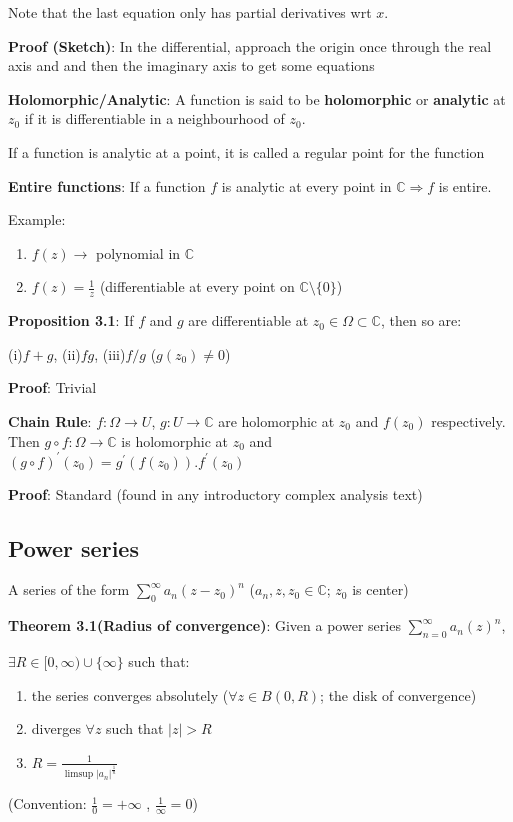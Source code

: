 \documentclass{article}
\begin{document}
\begin{flushleft}
Note that the last equation only has partial derivatives wrt $x$.

\textbf{Proof (Sketch)}: In the differential, approach the origin once through the real axis and and then the imaginary axis to get some equations  

\textbf{Holomorphic/Analytic}: A function is said to be \textbf{holomorphic} or \textbf{analytic} at $z_0$ if it is differentiable in a neighbourhood of $z_0$. 

If a function is analytic at a point, it is called a regular point for the function 

\textbf{Entire functions}: If a function $f$ is analytic at every point in $\mathds{C}\Rightarrow f$ is entire.

Example: 
\begin{enumerate}
\item $f(z)\rightarrow$ polynomial in $\mathds{C}$ 
\item$f(z)=\frac{1}{z}$ (differentiable at every point on $\mathds{C}\setminus \{0\}$)
\end{enumerate}
\textbf{Proposition 3.1}: If $f$ and $g$ are differentiable at $z_0\in \Omega \subset \mathds{C}$, then so are:

(i)$f+g$, (ii)$fg$, (iii)$f/g$ ($g(z_0)\neq 0$)

\textbf{Proof}: Trivial

\textbf{Chain Rule}: $f:\Omega \rightarrow U$, $g:U\rightarrow \mathds{C}$ are holomorphic at $z_0$ and $f(z_0)$ respectively.
Then $g\circ f:\Omega\rightarrow \mathds{C}$ is holomorphic at $z_0$ and $(g\circ f)^{'}(z_0)=g^{'}(f(z_0)).f^{'}(z_0)$

\textbf{Proof}: Standard (found in any introductory complex analysis text)

\subsection{\textbf{Power series}} 

A series of the form $\sum_{0}^{\infty} a_n(z-z_0)^n$ ($a_n,z,z_0\in \mathds{C}$; $z_0$ is center)

\textbf{Theorem 3.1(Radius of convergence)}: Given a power series $\sum_{n=0}^{\infty} a_n(z)^n$,

$\exists R\in [0,\infty) \cup \{\infty\}$ such that:
\begin{enumerate}
\item the series converges absolutely ($\forall z\in B(0,R)$; the disk of convergence)
\item diverges $\forall z$ such that $|z|>R$ 
\item $R=\frac{1}{\limsup |a_n|^{\frac{1}{n}}}$
\end{enumerate}
(Convention: $\frac{1}{0}=+\infty$ , $\frac{1}{\infty}=0$)


\end{flushleft}
\end{document}
